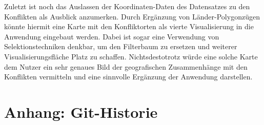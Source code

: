 \documentclass[usegeometry=true]{scrartcl}
\begin{document}
Zuletzt ist noch das Auslassen der Koordinaten-Daten des Datensatzes zu den Konflikten als Ausblick anzumerken. Durch Ergänzung von Länder-Polygonzügen könnte hiermit eine Karte mit den Konfliktorten als vierte Visualisierung in die Anwendung eingebaut werden. Dabei ist sogar eine Verwendung von Selektionstechniken denkbar, um den Filterbaum zu ersetzen und weiterer Visualisierungsfläche Platz zu schaffen. Nichtsdestotrotz würde eine solche Karte dem Nutzer ein sehr genaues Bild der geografischen Zusammenhänge mit den Konflikten vermitteln und eine sinnvolle Ergänzung der Anwendung darstellen.\\

\section*{Anhang: Git-Historie}

\printbibliography
\end{document}
